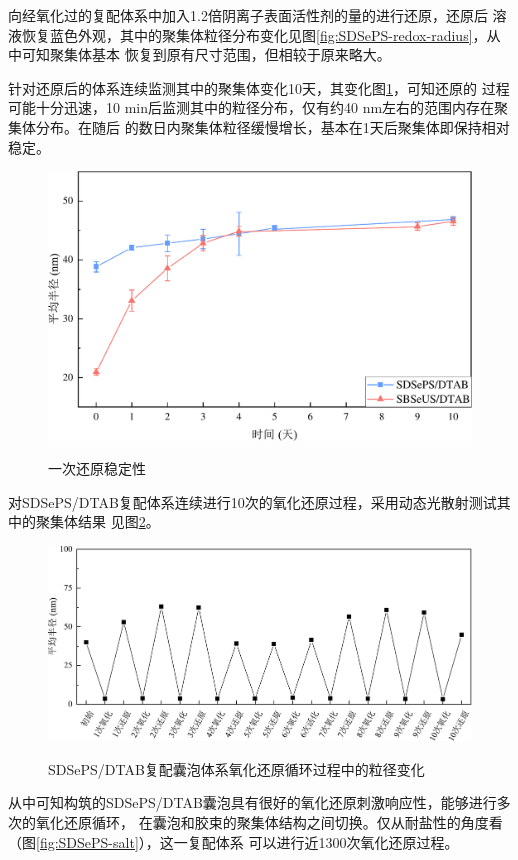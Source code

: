 \documentclass[bachelor,winfonts,replaceperiod]{jnuthesis}
\begin{document}
    向经氧化过的复配体系中加入1.2倍阴离子表面活性剂的量的进行还原，还原后
    溶液恢复蓝色外观，其中的聚集体粒径分布变化见图\ref{fig:SDSePS-redox-radius}，从中可知聚集体基本
    恢复到原有尺寸范围，但相较于原来略大。
    
    针对还原后的体系连续监测其中的聚集体变化10天，其变化图\ref{fig:vesicle-Re-stability}，可知还原的
    过程可能十分迅速，10 min后监测其中的粒径分布，仅有约40 nm左右的范围内存在聚集体分布。在随后
    的数日内聚集体粒径缓慢增长，基本在1天后聚集体即保持相对稳定。
    
    \begin{figure}[htbp]
        \centering
        \includegraphics[width=.6\textwidth]{figure/vesicle-Re-stability.pdf}\\
        \caption{一次还原稳定性}\label{fig:vesicle-Re-stability}
    \end{figure}
    
    对SDSePS/DTAB复配体系连续进行10次的氧化还原过程，采用动态光散射测试其中的聚集体结果
    见图\ref{fig:SDSePS-redox-circle}。
    \begin{figure}[htbp]
        \centering
        \includegraphics[width=.86\textwidth]{figure/SDSePS-redox-circle.pdf}\\
        \caption{SDSePS/DTAB复配囊泡体系氧化还原循环过程中的粒径变化}\label{fig:SDSePS-redox-circle}
    \end{figure}
    从中可知构筑的SDSePS/DTAB囊泡具有很好的氧化还原刺激响应性，能够进行多次的氧化还原循环，
    在囊泡和胶束的聚集体结构之间切换。仅从耐盐性的角度看（图\ref{fig:SDSePS-salt}），这一复配体系
    可以进行近1300次氧化还原过程。
    
\end{document}
